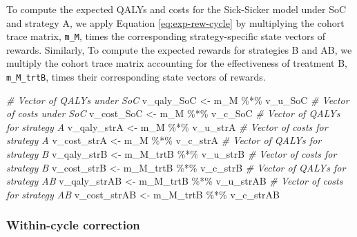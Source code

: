 \documentclass[
]{article}
\newenvironment{Shaded}{\begin{snugshade}}{\end{snugshade}}
\newcommand{\CommentTok}[1]{\textcolor[rgb]{0.56,0.35,0.01}{\textit{#1}}}
\newcommand{\NormalTok}[1]{#1}
\newcommand{\OtherTok}[1]{\textcolor[rgb]{0.56,0.35,0.01}{#1}}
\newcommand{\SpecialCharTok}[1]{\textcolor[rgb]{0.00,0.00,0.00}{#1}}
\begin{document}
To compute the expected QALYs and costs for the Sick-Sicker model under SoC and strategy A, we apply Equation \eqref{eq:exp-rew-cycle} by multiplying the cohort trace matrix, \texttt{m\_M}, times the corresponding strategy-specific state vectors of rewards. Similarly, To compute the expected rewards for strategies B and AB, we multiply the cohort trace matrix accounting for the effectiveness of treatment B, \texttt{m\_M\_trtB}, times their corresponding state vectors of rewards.

\begin{Shaded}
\begin{Highlighting}[]
\CommentTok{\# Vector of QALYs under SoC}
\NormalTok{v\_qaly\_SoC }\OtherTok{\textless{}{-}}\NormalTok{ m\_M }\SpecialCharTok{\%*\%}\NormalTok{ v\_u\_SoC}
\CommentTok{\# Vector of costs under SoC}
\NormalTok{v\_cost\_SoC }\OtherTok{\textless{}{-}}\NormalTok{ m\_M }\SpecialCharTok{\%*\%}\NormalTok{ v\_c\_SoC}
\CommentTok{\# Vector of QALYs for strategy A}
\NormalTok{v\_qaly\_strA }\OtherTok{\textless{}{-}}\NormalTok{ m\_M }\SpecialCharTok{\%*\%}\NormalTok{ v\_u\_strA}
\CommentTok{\# Vector of costs for strategy A}
\NormalTok{v\_cost\_strA }\OtherTok{\textless{}{-}}\NormalTok{ m\_M }\SpecialCharTok{\%*\%}\NormalTok{ v\_c\_strA}
\CommentTok{\# Vector of QALYs for strategy B}
\NormalTok{v\_qaly\_strB }\OtherTok{\textless{}{-}}\NormalTok{ m\_M\_trtB }\SpecialCharTok{\%*\%}\NormalTok{ v\_u\_strB}
\CommentTok{\# Vector of costs for strategy B}
\NormalTok{v\_cost\_strB }\OtherTok{\textless{}{-}}\NormalTok{ m\_M\_trtB }\SpecialCharTok{\%*\%}\NormalTok{ v\_c\_strB}
\CommentTok{\# Vector of QALYs for strategy AB}
\NormalTok{v\_qaly\_strAB }\OtherTok{\textless{}{-}}\NormalTok{ m\_M\_trtB }\SpecialCharTok{\%*\%}\NormalTok{ v\_u\_strAB}
\CommentTok{\# Vector of costs for strategy AB}
\NormalTok{v\_cost\_strAB }\OtherTok{\textless{}{-}}\NormalTok{ m\_M\_trtB }\SpecialCharTok{\%*\%}\NormalTok{ v\_c\_strAB}
\end{Highlighting}
\end{Shaded}

\hypertarget{within-cycle-correction}{%
\subsubsection{Within-cycle correction}\label{within-cycle-correction}}
\end{document}
